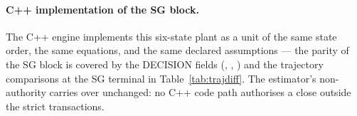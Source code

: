 \paragraph{C++ implementation of the SG block.}
The C++ engine implements this six-state plant as a unit of the same state
order, the same equations, and the same declared assumptions --- the parity
of the SG block is covered by the DECISION fields
(, , )
and the trajectory comparisons at the SG terminal in
Table~\ref{tab:trajdiff}.  The estimator's non-authority carries over
unchanged: no C++ code path authorises a close outside the strict
transactions.
